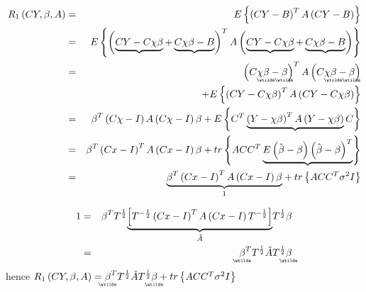 \documentclass{article}
\begin{document}
\begin{eqnarray}
R_{1}\left( CY,\beta ,A\right)  &=&E\left\{ \left( CY-B\right) ^{T}A\left(
CY-B\right) \right\}   \notag \\
&=&E\left\{ \left( \underbrace{CY-C\chi \beta }+\underbrace{C\chi \beta -B}%
\right) ^{T}A\left( \underbrace{CY-C\chi \beta }+\underbrace{C\chi \beta -B}%
\right) \right\}   \notag \\
&=&\left( C\chi 
\underaccent{\wtilde}{\beta}%
-%
\underaccent{\wtilde}{\beta}%
\right) ^{T}A\left( C\chi 
\underaccent{\wtilde}{\beta}%
-%
\underaccent{\wtilde}{\beta}%
\right)   \notag \\
&&+E\left\{ \left( CY-C\chi \beta \right) ^{T}A\left( CY-C\chi \beta \right)
\right\}   \notag \\
&=&\beta ^{T}\left( C\chi -I\right) A\left( C\chi -I\right) \beta +E\left\{
C^{T}\underbrace{\left( Y-\chi \beta \right) ^{T}A\left( Y-\chi \beta
\right) }C\right\}   \notag \\
&=&\beta ^{T}\left( Cx-I\right) ^{T}A\left( Cx-I\right) \beta +tr\left\{
ACC^{T}\underbrace{E\left( \hat{\beta}-\beta \right) \left( \hat{\beta}%
-\beta \right) ^{T}}\right\}   \notag \\
&=&\underset{1}{\underbrace{\beta ^{T}\left( Cx-I\right) ^{T}A\left(
Cx-I\right) \beta }}+tr\left\{ ACC^{T}\sigma ^{2}I\right\} 
\end{eqnarray}

\begin{eqnarray*}
1 &=&\beta ^{T}T^{\frac{1}{2}}\underset{\tilde{A}}{\underbrace{\left[ T^{-%
\frac{1}{2}}\left( Cx-I\right) ^{T}A\left( Cx-I\right) T^{-\frac{1}{2}}%
\right] }}T^{\frac{1}{2}}\beta  \\
&=&%
\underaccent{\wtilde}{\beta}%
^{T}T^{\frac{1}{2}}\tilde{A}T^{\frac{1}{2}}%
\underaccent{\wtilde}{\beta}%
\end{eqnarray*}%
hence $R_{1}\left( CY,\beta ,A\right) =%
\underaccent{\wtilde}{\beta}%
^{T}T^{\frac{1}{2}}\tilde{A}T^{\frac{1}{2}}%
\underaccent{\wtilde}{\beta}%
+tr\left\{ ACC^{T}\sigma ^{2}I\right\} $
\end{document}
